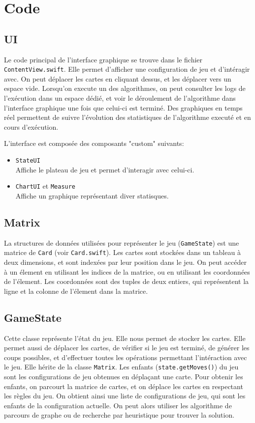 \chapter{Code}

\section{UI}
Le code principal de l'interface graphique se trouve dans le fichier \texttt{ContentView.swift}. Elle permet d'afficher une configuration de jeu et d'intéragir avec. On peut déplacer les cartes en cliquant dessus, et les déplacer vers un espace vide. Lorsqu'on execute un des algorithmes, on peut consulter les logs de l'exécution dans un espace dédié, et voir le déroulement de l'algorithme dans l'interface graphique une fois que celui-ci est terminé. Des graphiques en temps réel permettent de suivre l'évolution des statistiques de l'algorithme executé et en cours d'exécution.

L'interface est composée des composants "custom" suivants:
\begin{itemize}
      \item \texttt{StateUI} \\
            Affiche le plateau de jeu et permet d'interagir avec celui-ci.
      \item \texttt{ChartUI} et \texttt{Measure} \\
            Affiche un graphique représentant diver statisques.
\end{itemize}

\section{Matrix}
La structures de données utilisées pour représenter le jeu (\texttt{GameState}) est une matrice de \texttt{Card} (voir \texttt{Card.swift}). Les cartes sont stockées dans un tableau à deux dimensions, et sont indexées par leur position dans le jeu. On peut accéder à un élement en utilisant les indices de la matrice, ou en utilisant les coordonnées de l'élement. Les coordonnées sont des tuples de deux entiers, qui représentent la ligne et la colonne de l'élement dans la matrice.

\pagebreak

\section{GameState}
Cette classe représente l'état du jeu. Elle nous permet de stocker les cartes. Elle permet aussi de déplacer les cartes, de vérifier si le jeu est terminé, de générer les coups possibles, et d'effectuer toutes les opérations permettant l'intéraction avec le jeu. Elle hérite de la classe \texttt{Matrix}. Les enfants (\texttt{state.getMoves()}) du jeu sont les configurations de jeu obtenues en déplaçant une carte. Pour obtenir les enfants, on parcourt la matrice de cartes, et on déplace les cartes en respectant les règles du jeu. On obtient ainsi une liste de configurations de jeu, qui sont les enfants de la configuration actuelle. On peut alors utiliser les algorithme de parcours de graphe ou de recherche par heuristique pour trouver la solution.

